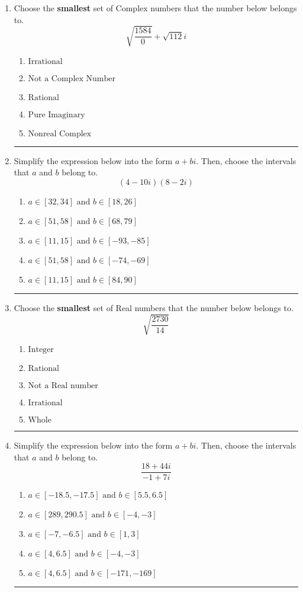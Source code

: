 \documentclass[14pt]{extbook}
\newcommand{\litem}[1]{\item#1\hspace*{-1cm}\rule{\textwidth}{0.4pt}}
\begin{document}
\begin{enumerate}
{\begin{enumerate}[label=\Alph*.]
\end{enumerate} }
\litem{
Choose the \textbf{smallest} set of Complex numbers that the number below belongs to.\[ \sqrt{\frac{1584}{0}}+\sqrt{112} i \]\begin{enumerate}[label=\Alph*.]
\item \( \text{Irrational} \)
\item \( \text{Not a Complex Number} \)
\item \( \text{Rational} \)
\item \( \text{Pure Imaginary} \)
\item \( \text{Nonreal Complex} \)

\end{enumerate} }
\litem{
Simplify the expression below into the form $a+bi$. Then, choose the intervals that $a$ and $b$ belong to.\[ (4 - 10 i)(8 - 2 i) \]\begin{enumerate}[label=\Alph*.]
\item \( a \in [32, 34] \text{ and } b \in [18, 26] \)
\item \( a \in [51, 58] \text{ and } b \in [68, 79] \)
\item \( a \in [11, 15] \text{ and } b \in [-93, -85] \)
\item \( a \in [51, 58] \text{ and } b \in [-74, -69] \)
\item \( a \in [11, 15] \text{ and } b \in [84, 90] \)

\end{enumerate} }
\litem{
Choose the \textbf{smallest} set of Real numbers that the number below belongs to.\[ \sqrt{\frac{2730}{14}} \]\begin{enumerate}[label=\Alph*.]
\item \( \text{Integer} \)
\item \( \text{Rational} \)
\item \( \text{Not a Real number} \)
\item \( \text{Irrational} \)
\item \( \text{Whole} \)

\end{enumerate} }
\litem{
Simplify the expression below into the form $a+bi$. Then, choose the intervals that $a$ and $b$ belong to.\[ \frac{18 + 44 i}{-1 + 7 i} \]\begin{enumerate}[label=\Alph*.]
\item \( a \in [-18.5, -17.5] \text{ and } b \in [5.5, 6.5] \)
\item \( a \in [289, 290.5] \text{ and } b \in [-4, -3] \)
\item \( a \in [-7, -6.5] \text{ and } b \in [1, 3] \)
\item \( a \in [4, 6.5] \text{ and } b \in [-4, -3] \)
\item \( a \in [4, 6.5] \text{ and } b \in [-171, -169] \)


\end{enumerate}}
\end{enumerate}
\end{document}
